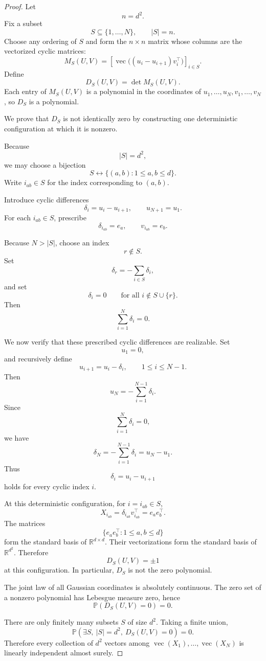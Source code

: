 \documentclass[11pt]{article}
\newcommand{\R}{\mathbb{R}}
\newcommand{\Pp}{\mathbb{P}}
\newcommand{\1}{\mathbf{1}}
\newcommand{\vecop}{\operatorname{vec}}
\begin{document}
\begin{proof}
Let
\[
n=d^2.
\]
Fix a subset
\[
S\subseteq\{1,\dots,N\},
\qquad
|S|=n.
\]
Choose any ordering of \(S\) and form the \(n\times n\) matrix whose
columns are the vectorized cyclic matrices:
\[
M_S(U,V)
=
\left[
\vecop\bigl((u_i-u_{i+1})v_i^\top\bigr)
\right]_{i\in S}.
\]
Define
\[
D_S(U,V)=\det M_S(U,V).
\]
Each entry of \(M_S(U,V)\) is a polynomial in the coordinates of
\(u_1,\dots,u_N,v_1,\dots,v_N\), so \(D_S\) is a polynomial.

We prove that \(D_S\) is not identically zero by constructing one
deterministic configuration at which it is nonzero.

Because
\[
|S|=d^2,
\]
we may choose a bijection
\[
S\longleftrightarrow\{(a,b):1\le a,b\le d\}.
\]
Write \(i_{ab}\in S\) for the index corresponding to \((a,b)\).

Introduce cyclic differences
\[
\delta_i=u_i-u_{i+1},
\qquad
u_{N+1}=u_1.
\]
For each \(i_{ab}\in S\), prescribe
\[
\delta_{i_{ab}}=e_a,
\qquad
v_{i_{ab}}=e_b.
\]

Because \(N>|S|\), choose an index
\[
r\notin S.
\]
Set
\[
\delta_r
=
-\sum_{i\in S}\delta_i,
\]
and set
\[
\delta_i=0
\qquad
\text{for all }i\notin S\cup\{r\}.
\]
Then
\[
\sum_{i=1}^{N}\delta_i=0.
\]

We now verify that these prescribed cyclic differences are realizable.
Set
\[
u_1=0,
\]
and recursively define
\[
u_{i+1}=u_i-\delta_i,
\qquad
1\le i\le N-1.
\]
Then
\[
u_N
=
-\sum_{i=1}^{N-1}\delta_i.
\]
Since
\[
\sum_{i=1}^{N}\delta_i=0,
\]
we have
\[
\delta_N
=
-\sum_{i=1}^{N-1}\delta_i
=
u_N-u_1.
\]
Thus
\[
\delta_i=u_i-u_{i+1}
\]
holds for every cyclic index \(i\).

At this deterministic configuration, for \(i=i_{ab}\in S\),
\[
X_{i_{ab}}
=
\delta_{i_{ab}}v_{i_{ab}}^\top
=
e_ae_b^\top.
\]
The matrices
\[
\{e_ae_b^\top:1\le a,b\le d\}
\]
form the standard basis of \(\R^{d\times d}\). Their vectorizations form
the standard basis of \(\R^{d^2}\). Therefore
\[
D_S(U,V)=\pm 1
\]
at this configuration. In particular, \(D_S\) is not the zero polynomial.

The joint law of all Gaussian coordinates is absolutely continuous.
The zero set of a nonzero polynomial has Lebesgue measure zero, hence
\[
\Pp(D_S(U,V)=0)=0.
\]

There are only finitely many subsets \(S\) of size \(d^2\). Taking a
finite union,
\[
\Pp\left(
\exists S,\ |S|=d^2,\ D_S(U,V)=0
\right)
=0.
\]
Therefore every collection of \(d^2\) vectors among
\(\vecop(X_1),\dots,\vecop(X_N)\) is linearly independent almost surely.
\end{proof}
\end{document}
